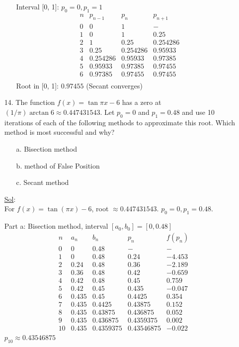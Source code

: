 \begin{enumerate}
\begin{enumerate}
        Interval [0, 1]: \( p_0 = 0, p_1 = 1 \)
        \[
          \begin{array}{l|lll}
            n & p_{n-1} & p_n & p_{n+1} \\
            \hline
            0 & 0 & 1 & - \\
            1 & 0 & 1 & 0.25 \\
            2 & 1 & 0.25 & 0.254286 \\
            3 & 0.25 & 0.254286 & 0.95933 \\
            4 & 0.254286 & 0.95933 & 0.97385 \\
            5 & 0.95933 & 0.97385 & 0.97455 \\
            6 & 0.97385 & 0.97455 & 0.97455 \\
          \end{array}
        \]
        Root in [0, 1]: \( \boxed{0.97455} \) (Secant converges)
    \end{enumerate}

  \item[14.] The function \( f(x) = \tan \pi x - 6 \) has a zero at
    \( (1/\pi) \arctan 6 \approx 0.447431543 \). Let \( p_0 = 0\) and
    \( p_1 = 0.48 \) and use 10 iterations of each of the following
    methods to approximate this root. Which method is most successful and why?
    \begin{enumerate}
      \item[a.] Bisection method
      \item[b.] method of False Position
      \item[c.] Secant method
    \end{enumerate}

    \underline{Sol}:\\
    For \( f(x) = \tan(\pi x) - 6 \), root \( \approx 0.447431543 \).
    \( p_0 = 0, p_1 = 0.48 \).

    Part a: Bisection method, interval \( [a_0, b_0] = [0, 0.48] \)
    \[
      \begin{array}{l|llll}
        n & a_n & b_n & p_n & f(p_n) \\
        \hline
        0 & 0 & 0.48 & - & - \\
        1 & 0 & 0.48 & 0.24 & -4.453 \\
        2 & 0.24 & 0.48 & 0.36 & -2.189 \\
        3 & 0.36 & 0.48 & 0.42 & -0.659 \\
        4 & 0.42 & 0.48 & 0.45 & 0.759 \\
        5 & 0.42 & 0.45 & 0.435 & -0.047 \\
        6 & 0.435 & 0.45 & 0.4425 & 0.354 \\
        7 & 0.435 & 0.4425 & 0.43875 & 0.152 \\
        8 & 0.435 & 0.43875 & 0.436875 & 0.052 \\
        9 & 0.435 & 0.436875 & 0.4359375 & 0.002 \\
        10 & 0.435 & 0.4359375 & 0.43546875 & -0.022 \\
      \end{array}
    \]
    \( p_{10} \approx 0.43546875 \)


\end{enumerate}
